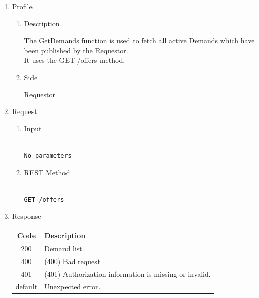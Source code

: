 \begin{enumerate}

\item Profile

\begin{enumerate}

\item Description

The GetDemands function is used to fetch all active Demands which have been published by the Requestor. \\ 
It uses the GET /offers method.

\item Side

Requestor

\end{enumerate}

\item Request

\begin{enumerate}

\item Input

\begin{tcolorbox}[boxrule=0pt, frame empty]
\begin{verbatim}

No parameters

\end{verbatim}
\end{tcolorbox}

\item REST Method

\begin{tcolorbox}[boxrule=0pt, frame empty]
\begin{verbatim} 

GET /offers

\end{verbatim}
\end{tcolorbox}

\end{enumerate}

\item Response

\begin{table}[H]
\footnotesize

\begin{center}
\begin{tabular}{|c|l|} 
\hline
\rowcolor{lightgray}	Code 		& 	Description \\
\hline
200	 		&	Demand list. \\
\hline
400			&	(400) Bad request \\
\hline
401			&	(401) Authorization information is missing or invalid. \\
\hline
default		&	Unexpected error. \\
\hline
\end{tabular}
\end{center}


\end{table}
\end{enumerate}
